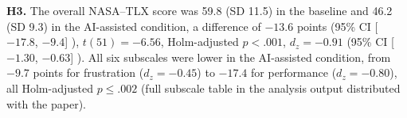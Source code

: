 \documentclass[journal]{IEEEtran}
\theoremstyle{plain}
\theoremstyle{definition}
\providecommand{\DIFaddtex}[1]{{\protect\color{blue} \sf #1}} %
\providecommand{\DIFaddbegin}{} %
\providecommand{\DIFaddend}{} %
\providecommand{\DIFdelbegin}{} %
\providecommand{\DIFdelend}{} %
\providecommand{\DIFadd}[1]{\texorpdfstring{\DIFaddtex{#1}}{#1}} %
\newcommand{\DIFscaledelfig}{0.5}
\newlength{\DIFdelgraphicswidth} %
\newlength{\DIFdelgraphicsheight} %
\newcommand{\DIFaddincludegraphics}[2][]{{\color{blue}\fbox{\DIFOincludegraphics[#1]{#2}}}} %
\newcommand{\DIFdelincludegraphics}[2][]{%
\sbox{\DIFdelgraphicsbox}{\DIFOincludegraphics[#1]{#2}}%
\settoboxwidth{\DIFdelgraphicswidth}{\DIFdelgraphicsbox} %
\settoboxtotalheight{\DIFdelgraphicsheight}{\DIFdelgraphicsbox} %
\scalebox{\DIFscaledelfig}{%
\parbox[b]{\DIFdelgraphicswidth}{\usebox{\DIFdelgraphicsbox}\\[-\baselineskip] \rule{\DIFdelgraphicswidth}{0em}}\llap{\resizebox{\DIFdelgraphicswidth}{\DIFdelgraphicsheight}{%
\setlength{\unitlength}{\DIFdelgraphicswidth}%
\begin{picture}(1,1)%
\thicklines\linethickness{2pt} %
{\color[rgb]{1,0,0}\put(0,0){\framebox(1,1){}}}%
{\color[rgb]{1,0,0}\put(0,0){\line( 1,1){1}}}%
{\color[rgb]{1,0,0}\put(0,1){\line(1,-1){1}}}%
\end{picture}%
}\hspace*{3pt}}} %
} %
\DeclareRobustCommand{\DIFaddbegin}{\DIFOaddbegin \let\includegraphics\DIFaddincludegraphics} %
\DeclareRobustCommand{\DIFaddend}{\DIFOaddend \let\includegraphics\DIFOincludegraphics} %
\DeclareRobustCommand{\DIFdelbegin}{\DIFOdelbegin \let\includegraphics\DIFdelincludegraphics} %
\DeclareRobustCommand{\DIFdelend}{\DIFOaddend \let\includegraphics\DIFOincludegraphics} %
\begin{document}
    \DIFdelbegin %
\DIFdelend \DIFaddbegin \DIFadd{\textbf{H3.} The overall NASA--TLX score was 59.8 (SD 11.5) in the baseline and 46.2 (SD 9.3) in the AI-assisted condition, a difference of $-13.6$ points (95\% CI }[\DIFadd{$-17.8$, $-9.4$}]\DIFadd{), $t(51)=-6.56$, Holm-adjusted $p<.001$, $d_z=-0.91$ (95\% CI }[\DIFadd{$-1.30$, $-0.63$}]\DIFadd{). All six subscales were lower in the AI-assisted condition, from $-9.7$ points for frustration ($d_z=-0.45$) to $-17.4$ for performance ($d_z=-0.80$), all Holm-adjusted $p \leq .002$ (full subscale table in the analysis output distributed with the paper).
}\DIFaddend 
\end{document}
